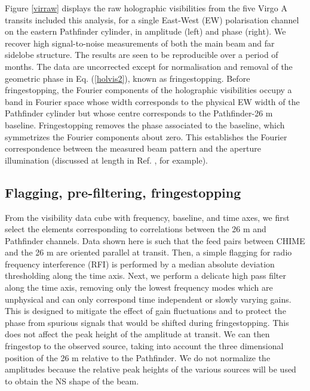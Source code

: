 Figure \ref{virraw} displays the raw holographic visibilities from the five Virgo A transits included this analysis, for a single East-West (EW) polarisation channel on the eastern Pathfinder cylinder, in amplitude (left) and phase (right). We recover high signal-to-noise measurements of both the main beam and far sidelobe structure. The results are seen to be reproducible over a period of months. The data are uncorrected except for normalisation and removal of the geometric phase in Eq. (\ref{holvis2}), known as fringestopping. Before fringestopping, the Fourier components of the holographic visibilities occupy a band in Fourier space whose width corresponds to the physical EW width of the Pathfinder cylinder but whose centre corresponds to the Pathfinder-26 m baseline. Fringestopping removes the phase associated to the baseline, which symmetrizes the Fourier components about zero. This establishes the Fourier correspondence between the measured beam pattern and the aperture illumination (discussed at length in Ref. \citep{radio2}, for example).

\subsection{Flagging, pre-filtering, fringestopping}
From the visibility data cube with frequency, baseline, and time axes, we first select the elements corresponding to correlations between the 26 m and Pathfinder channels. Data shown here is such that the feed pairs between CHIME and the 26 m are oriented parallel at transit. Then, a simple flagging for radio frequency interference (RFI) is performed by a median absolute deviation thresholding along the time axis. Next, we perform a delicate high pass filter along the time axis, removing only the lowest frequency modes which are unphysical and can only correspond time independent or slowly varying gains. This is designed to mitigate the effect of gain fluctuations and to protect the phase from spurious signals that would be shifted during fringestopping. This does not affect the peak height of the amplitude at transit. We can then fringestop to the observed source, taking into account the three dimensional position of the 26 m relative to the Pathfinder. We do not normalize the amplitudes because the relative peak heights of the various sources will be used to obtain the NS shape of the beam.

